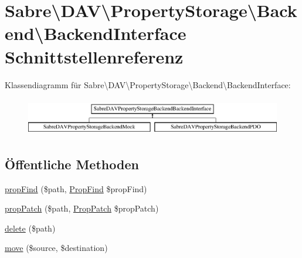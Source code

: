 \hypertarget{interface_sabre_1_1_d_a_v_1_1_property_storage_1_1_backend_1_1_backend_interface}{}\section{Sabre\textbackslash{}D\+AV\textbackslash{}Property\+Storage\textbackslash{}Backend\textbackslash{}Backend\+Interface Schnittstellenreferenz}
\label{interface_sabre_1_1_d_a_v_1_1_property_storage_1_1_backend_1_1_backend_interface}
Klassendiagramm für Sabre\textbackslash{}D\+AV\textbackslash{}Property\+Storage\textbackslash{}Backend\textbackslash{}Backend\+Interface\+:\begin{figure}[H]
\begin{center}
\leavevmode
\includegraphics[height=1.656805cm]{interface_sabre_1_1_d_a_v_1_1_property_storage_1_1_backend_1_1_backend_interface}
\end{center}
\end{figure}
\subsection*{Öffentliche Methoden}
\begin{DoxyCompactItemize}
\item 
\mbox{\hyperlink{interface_sabre_1_1_d_a_v_1_1_property_storage_1_1_backend_1_1_backend_interface_a08b66469a69989bdc8d016b10071e01c}{prop\+Find}} (\$path, \mbox{\hyperlink{class_sabre_1_1_d_a_v_1_1_prop_find}{Prop\+Find}} \$prop\+Find)
\item 
\mbox{\hyperlink{interface_sabre_1_1_d_a_v_1_1_property_storage_1_1_backend_1_1_backend_interface_ad0060806625e44b35b8d1ea42d900d4d}{prop\+Patch}} (\$path, \mbox{\hyperlink{class_sabre_1_1_d_a_v_1_1_prop_patch}{Prop\+Patch}} \$prop\+Patch)
\item 
\mbox{\hyperlink{interface_sabre_1_1_d_a_v_1_1_property_storage_1_1_backend_1_1_backend_interface_a4930add42ecbd12a23515224b7c73e6c}{delete}} (\$path)
\item 
\mbox{\hyperlink{interface_sabre_1_1_d_a_v_1_1_property_storage_1_1_backend_1_1_backend_interface_a6ada599e02c26b6452b0b06b78d48505}{move}} (\$source, \$destination)
\end{DoxyCompactItemize}


